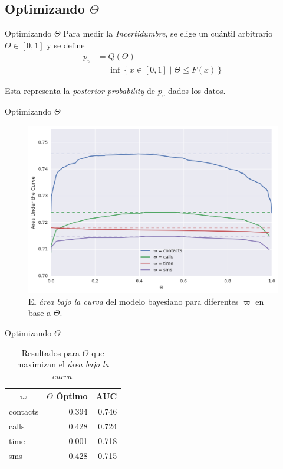 \documentclass[usenames,dvipsnames,table]{beamer}
\newcommand{\ct}[1]{\multicolumn{1}{c}{#1}}
\begin{document}
\subsection{Optimizando $\Theta$}

\begin{frame}{Optimizando $\Theta$}
	Para medir la \emph{Incertidumbre}, se elige un cuántil arbitrario $\Theta \in \left[ 0, 1 \right]$ y se define
	\begin{align*}
		p_v &= Q \left( \Theta \right) \\
		&= \inf \left\{ x \in \left[ 0, 1 \right] \mid \Theta \leq F \left( x \right) \right\}
	\end{align*}

	Esta representa la \emph{posterior probability} de $p_v$ dados los datos.
\end{frame}

\begin{frame}{Optimizando $\Theta$}
	\begin{figure}
		\includegraphics[height=.75\textheight]{theta.png}
		\caption{El \emph{área bajo la curva} del modelo bayesiano para diferentes $\varpi$ en base a $\Theta$.}
	\end{figure}
\end{frame}

\begin{frame}{Optimizando $\Theta$}
	\begin{table}
		\centering
		\begin{tabular}{l r r}
			\toprule
			\ct{$\varpi$}& \ct{$\Theta$ Óptimo} & \ct{AUC} \\
			\midrule
			contacts & \num{0.394} & \num{0.746} \\
			calls & \num{0.428} & \num{0.724} \\
			time & \num{0.001} & \num{0.718} \\
			sms & \num{0.428} & \num{0.715} \\
			\bottomrule
		\end{tabular}
		\caption{Resultados para $\Theta$ que maximizan el \emph{área bajo la curva}.}
	\end{table}
\end{frame}
\end{document}
